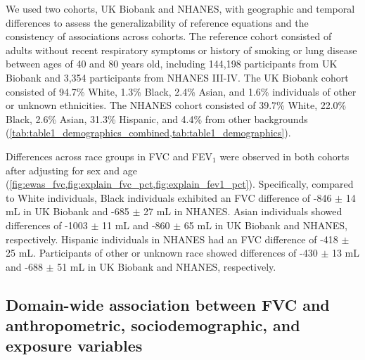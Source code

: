 \documentclass[10pt]{extarticle}
\begin{document}
We used two cohorts, UK Biobank and NHANES, with geographic and temporal differences to assess the generalizability of reference equations and the consistency of associations across cohorts. The reference cohort consisted of adults without recent respiratory symptoms or history of smoking or lung disease between ages of 40 and 80 years old, including 144,198 participants from UK Biobank and 3,354 participants from NHANES III-IV. The UK Biobank cohort consisted of 94.7\% White, 1.3\% Black, 2.4\% Asian, and 1.6\% individuals of other or unknown ethnicities. The NHANES cohort consisted of 39.7\% White, 22.0\% Black, 2.6\% Asian, 31.3\% Hispanic, and 4.4\% from other backgrounds (\cref{tab:table1_demographics_combined,tab:table1_demographics}).

Differences across race groups in FVC and FEV$_{1}$ were observed in both cohorts after adjusting for sex and age (\cref{fig:ewas_fvc,fig:explain_fvc_pct,fig:explain_fev1_pct}). Specifically, compared to White individuals, Black individuals exhibited an FVC difference of -846 $\pm$ 14 mL in UK Biobank and -685 $\pm$ 27 mL in NHANES. Asian individuals showed differences of -1003 $\pm$ 11 mL and -860 $\pm$ 65 mL in UK Biobank and NHANES, respectively. Hispanic individuals in NHANES had an FVC difference of -418 $\pm$ 25 mL. Participants of other or unknown race showed differences of -430 $\pm$ 13 mL and -688 $\pm$ 51 mL in UK Biobank and NHANES, respectively.

\subsection{Domain-wide association between FVC and anthropometric, sociodemographic, and exposure variables}\label{ARC_NatureHealth_v2:domain-wide-association-between-fvc-and-anthropometric-sociodemographic-and-exposure-variables}
\end{document}
